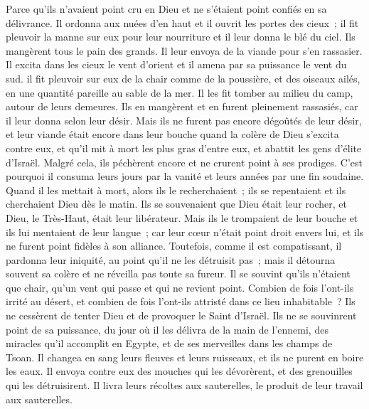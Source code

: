 \begin{multicols}{2}
Parce qu'ils n'avaient point cru en Dieu et ne s'étaient point confiés en sa délivrance.
Il ordonna aux nuées d'en haut et il ouvrit les portes des cieux~;
il fit pleuvoir la manne sur eux pour leur nourriture et il leur donna le blé du ciel.
Ils mangèrent tous le pain des grands. Il leur envoya de la viande pour s'en rassasier.
Il excita dans les cieux le vent d'orient et il amena par sa puissance le vent du sud.
il fit pleuvoir sur eux de la chair comme de la poussière, et des oiseaux ailés, en une quantité pareille au sable de la mer.
Il les fit tomber au milieu du camp, autour de leurs demeures.
Ils en mangèrent et en furent pleinement rassasiés, car il leur donna selon leur désir.
Mais ils ne furent pas encore dégoûtés de leur désir, et leur viande était encore dans leur bouche
quand la colère de Dieu s'excita contre eux, et qu'il mit à mort les plus gras d'entre eux, et abattit les gens d'élite d'Israël.
Malgré cela, ils péchèrent encore et ne crurent point à ses prodiges.
C'est pourquoi il consuma leurs jours par la vanité et leurs années par une fin soudaine.
Quand il les mettait à mort, alors ils le recherchaient~; ils se repentaient et ils cherchaient Dieu dès le matin.
Ils se souvenaient que Dieu était leur rocher, et Dieu, le Très-Haut, était leur libérateur.
Mais ils le trompaient de leur bouche et ils lui mentaient de leur langue~;
car leur cœur n'était point droit envers lui, et ils ne furent point fidèles à son alliance.
Toutefois, comme il est compatissant, il pardonna leur iniquité, au point qu'il ne les détruisit pas~; mais il détourna souvent sa colère et ne réveilla pas toute sa fureur.
Il se souvint qu'ils n'étaient que chair, qu'un vent qui passe et qui ne revient point.
Combien de fois l'ont-ils irrité au désert, et combien de fois l'ont-ils attristé dans ce lieu inhabitable~?
Ils ne cessèrent de tenter Dieu et de provoquer le Saint d'Israël.
Ils ne se souvinrent point de sa puissance, du jour où il les délivra de la main de l'ennemi,
des miracles qu'il accomplit en Egypte, et de ses merveilles dans les champs de Tsoan.
Il changea en sang leurs fleuves et leurs ruisseaux, et ils ne purent en boire les eaux.
Il envoya contre eux des mouches qui les dévorèrent, et des grenouilles qui les détruisirent.
Il livra leurs récoltes aux sauterelles, le produit de leur travail aux sauterelles.

\end{multicols}
